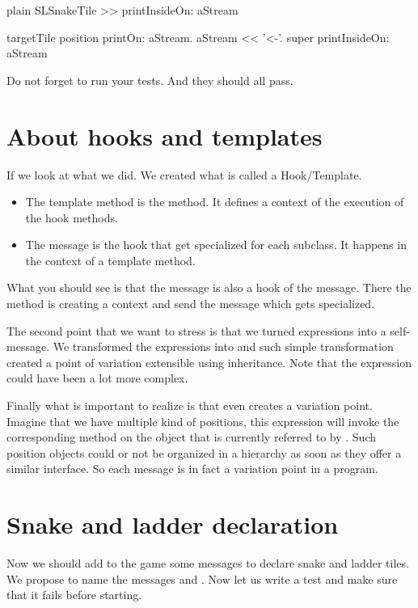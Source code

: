 \documentclass[10pt,twoside,english]{_support/latex/sbabook/sbabook}
\begin{document}
\begin{displaycode}{plain}
SLSnakeTile >> printInsideOn: aStream

	targetTile position printOn: aStream. 
	aStream << '<-'.
	super printInsideOn: aStream
\end{displaycode}

Do not forget to run your tests. And they should all pass. 
\section{About hooks and templates}
If we look at what we did. We created what is called a Hook/Template. 

\begin{itemize}
\item The template method is the  method. It defines a context of the execution of the hook methods.
\item The  message is the hook that get specialized for each subclass. It happens in the context of a template method. 
\end{itemize}

What you should see is that the  message is also a hook of the  message. There the  method is creating a context and send the message  which gets specialized. 

The second point that we want to stress is that we turned expressions into a self-message.
We transformed the expressions  into  and such simple transformation created a point of variation extensible using inheritance. Note that the expression could have been a lot more complex. 

Finally what is important to realize is that even  creates a variation point. Imagine that we have multiple kind of positions, this expression will invoke the corresponding method on the object that is currently referred to by . Such position objects could or not be organized in a hierarchy as soon as they offer a similar interface. So each message is in fact a variation point in a program. 
\section{Snake and ladder declaration}
Now we should add to the game some messages to declare snake and ladder tiles. 
We propose to name the messages  and .
Now let us write a test and make sure that it fails before starting.
\end{document}
